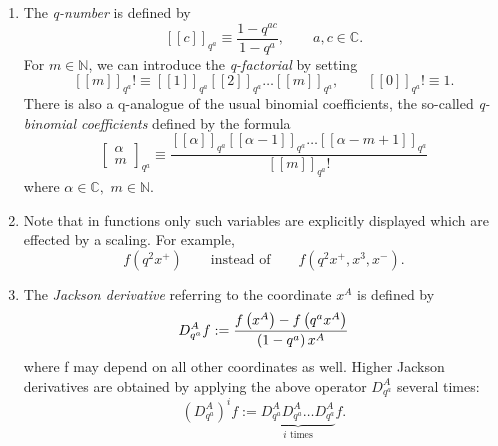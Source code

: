 \documentclass[a4paper,11pt,oneside]{article}
\newcommand{\text}[1]{\mbox{#1}}
\begin{document}
\begin{enumerate}
\item  The \textit{q-number} is defined by \cite{KS97} 
\begin{equation}
\left[ \left[ c\right] \right] _{q^{a}}\equiv \frac{1-q^{ac}}{1-q^{a}}%
,\qquad a,c\in \mathbb{C}.
\end{equation}
For $m\in \mathbb{N}$, we can introduce the \textit{q-factorial }by setting 
\begin{equation}
\left[ \left[ m\right] \right] _{q^{a}}!\equiv \left[ \left[ 1\right]
\right] _{q^{a}}\left[ \left[ 2\right] \right] _{q^{a}}\ldots \left[ \left[
m\right] \right] _{q^{a}},\qquad \left[ \left[ 0\right] \right]
_{q^{a}}!\equiv 1.
\end{equation}
There is also a q-analogue of the usual binomial coefficients, the so-called 
\textit{q-binomial coefficients} defined by the formula 
\begin{equation}
\left[ \begin{array}{c} \alpha\\m \end{array}\right]_{q^{a}}\equiv \frac{\left[ \left[ \alpha \right]
\right] _{q^{a}}\left[ \left[ \alpha -1\right] \right] _{q^{a}}\ldots \left[
\left[ \alpha -m+1\right] \right] _{q^{a}}}{\left[ \left[ m\right] \right]
_{q^{a}}!}
\end{equation}
where $\alpha \in \mathbb{C},$ $m\in \mathbb{N}$.

\item  Note that in functions only such variables are explicitly displayed
which are effected by a scaling. For example, 
\begin{equation}
f\left( q^{2}x^{+}\right) \qquad \text{instead of}\qquad f\left(
q^{2}x^{+},x^{3},x^{-}\right) .
\end{equation}

\item  The \textit{Jackson derivative} referring to the coordinate $x^{A}$ is
defined by 
\begin{equation}
D_{q^{a}}^{A}f:=\frac{f\left( x^{A}\right) -f\left( q^{a}x^{A}\right) }{%
\left( 1-q^{a}\right) x^{A}}
\end{equation}
where f may depend on all other coordinates as well. Higher Jackson
derivatives are obtained by applying the above operator $D_{q^{a}}^{A}$
several times: 
\begin{equation}
\left( D_{q^{a}}^{A}\right) ^{i}f:=\underbrace{D_{q^{a}}^{A}D_{q^{a}}^{A}%
\ldots D_{q^{a}}^{A}}_{i\text{ times}}f.
\end{equation}


\end{enumerate}
\end{document}
